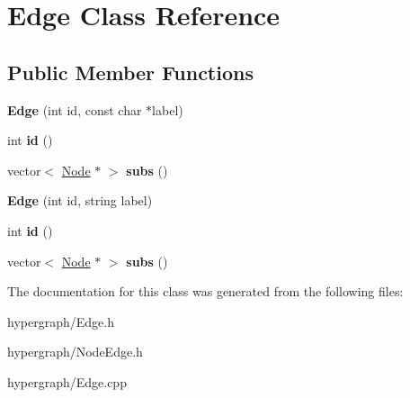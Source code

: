 \hypertarget{classEdge}{
\section{Edge Class Reference}
\label{classEdge}
}
\subsection*{Public Member Functions}
\begin{DoxyCompactItemize}
\item 
\hypertarget{classEdge_af6315cb28c2d3822f122603645f3b90c}{
{\bfseries Edge} (int id, const char $\ast$label)}
\label{classEdge_af6315cb28c2d3822f122603645f3b90c}

\item 
\hypertarget{classEdge_ad0affb509ed506ad706bff9f6b7296a1}{
int {\bfseries id} ()}
\label{classEdge_ad0affb509ed506ad706bff9f6b7296a1}

\item 
\hypertarget{classEdge_a149c34c78f5c918c03852c48f5ae0af2}{
vector$<$ \hyperlink{classNode}{Node} $\ast$ $>$ {\bfseries subs} ()}
\label{classEdge_a149c34c78f5c918c03852c48f5ae0af2}

\item 
\hypertarget{classEdge_af89d7b8387c4220a3cb96596f96b75c1}{
{\bfseries Edge} (int id, string label)}
\label{classEdge_af89d7b8387c4220a3cb96596f96b75c1}

\item 
\hypertarget{classEdge_ad0affb509ed506ad706bff9f6b7296a1}{
int {\bfseries id} ()}
\label{classEdge_ad0affb509ed506ad706bff9f6b7296a1}

\item 
\hypertarget{classEdge_a149c34c78f5c918c03852c48f5ae0af2}{
vector$<$ \hyperlink{classNode}{Node} $\ast$ $>$ {\bfseries subs} ()}
\label{classEdge_a149c34c78f5c918c03852c48f5ae0af2}

\end{DoxyCompactItemize}


The documentation for this class was generated from the following files:\begin{DoxyCompactItemize}
\item 
hypergraph/Edge.h\item 
hypergraph/NodeEdge.h\item 
hypergraph/Edge.cpp\end{DoxyCompactItemize}
